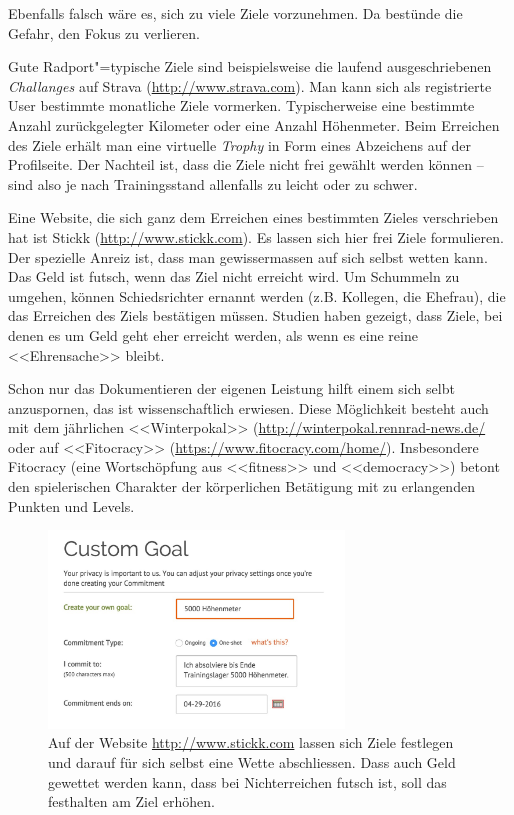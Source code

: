 \documentclass[a4paper,DIV13,BCOR0cm,draft=TRUE]{scrartcl}
\begin{document}
Ebenfalls falsch wäre es, sich zu viele Ziele vorzunehmen.
Da bestünde die Gefahr, den Fokus zu verlieren.

Gute Radport"=typische Ziele sind beispielsweise die laufend ausgeschriebenen \textsl{Challanges} auf Strava (\url{http://www.strava.com}).
Man kann sich als registrierte User bestimmte monatliche Ziele vormerken.
Typischerweise eine bestimmte Anzahl zurückgelegter Kilometer oder eine Anzahl Höhenmeter.
Beim Erreichen des Ziele erhält man eine virtuelle \textsl{Trophy} in Form eines Abzeichens auf der Profilseite.
Der Nachteil ist, dass die Ziele nicht frei gewählt werden können -- sind also je nach Trainingsstand allenfalls zu leicht oder zu schwer.

Eine Website, die sich ganz dem Erreichen eines bestimmten Zieles verschrieben hat ist Stickk (\url{http://www.stickk.com}).
Es lassen sich hier frei Ziele formulieren.
Der spezielle Anreiz ist, dass man gewissermassen auf sich selbst wetten kann.
Das Geld ist futsch, wenn das Ziel nicht erreicht wird.
Um Schummeln zu umgehen, können Schiedsrichter ernannt werden (z.B. Kollegen, die Ehefrau), die das Erreichen des Ziels bestätigen müssen.
Studien haben gezeigt, dass Ziele, bei denen es um Geld geht eher erreicht werden, als wenn es eine reine <<Ehrensache>> bleibt.

Schon nur das Dokumentieren der eigenen Leistung hilft einem sich selbt anzuspornen,
das ist wissenschaftlich erwiesen.
Diese Möglichkeit besteht auch mit dem jährlichen <<Winterpokal>> (\url{http://winterpokal.rennrad-news.de/} oder
auf <<Fitocracy>> (\url{https://www.fitocracy.com/home/}).
Insbesondere Fitocracy
(eine Wortschöpfung aus <<fitness>> und <<democracy>>)
betont den spielerischen Charakter der körperlichen Betätigung mit zu erlangenden Punkten und Levels.


\begin{figure}[htb]
  \centering
  \includegraphics[width=0.7\textwidth]{figs/stickkcom.jpg}

  \caption{Auf der Website \protect\url{http://www.stickk.com} lassen sich Ziele festlegen und darauf für sich selbst eine Wette abschliessen.
    Dass auch Geld gewettet werden kann, dass bei Nichterreichen futsch ist, soll das festhalten am Ziel erhöhen.}
  \label{fig:stickkcom}
\end{figure}
\end{document}
